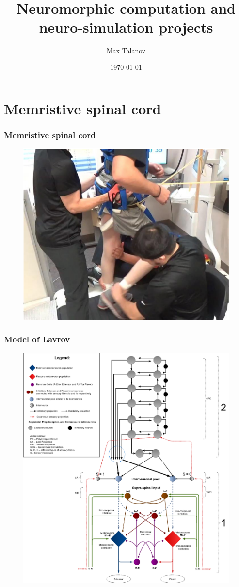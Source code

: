 \documentclass[12pt, aspectratio=169]{beamer}
\title[Neuromorphic computation and neuro-simulation projects]{Neuromorphic computation and neuro-simulation projects} %
\author[Max Talanov]{
  Max Talanov
}
\institute[Neurobiology laboratory, ITIS: KFU]%
{
ITIS/Neurobiology laboratory, KFU \\ %
\medskip
\textit{max.talanov@gmail.com} %
}
\date{\today} %
\begin{document}
\begin{frame}
\titlepage %
\end{frame}


\section{Memristive spinal cord}
\begin{frame}
  \frametitle{Memristive spinal cord}
  \begin{figure}
    \includegraphics[width=0.5\linewidth]{neurorehabilitation}
  \end{figure}
\end{frame}
\begin{frame}
  \frametitle{Model of Lavrov}
  \begin{figure}
    \includegraphics[width=0.48\linewidth]{spinal-cord-diagram}
  \end{figure}
\end{frame}
\end{document}
